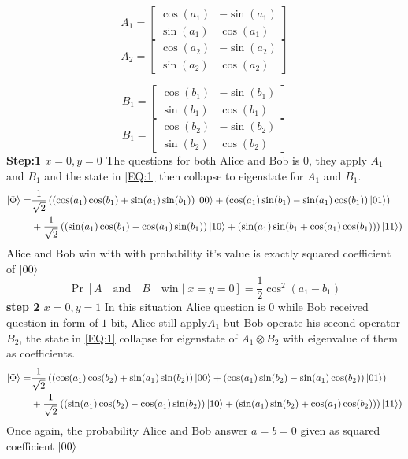 \[
A_1=
  \begin{bmatrix}
   \cos(a_1) & -\sin(a_1)\\
   \sin(a_1) & \cos(a_1)
  \end{bmatrix}
\]
\[
A_2=
  \begin{bmatrix}
   \cos(a_2) & -\sin(a_2)\\
   \sin(a_2) & \cos(a_2)
  \end{bmatrix}
\]

\[
B_1=
  \begin{bmatrix}
   \cos(b_1) & -\sin(b_1)\\
   \sin(b_1) & \cos(b_1)
  \end{bmatrix}
\]
\[
B_1=
  \begin{bmatrix}
   \cos(b_2) & -\sin(b_2)\\
   \sin(b_2) & \cos(b_2)
  \end{bmatrix}
\]
\textbf{Step:1 $x=0 ,y=0$}
The questions  for both Alice and Bob is  $0$, they apply $A_1$ and $B_1$ and the state in \ref{EQ:1} then collapse to eigenstate for $A_1$ and $B_1$.
\begin{align*}
\ket{\Phi}=&\frac{1}{\sqrt{2}}\left( \left(\cos(a_1) \cos(b_1) +\sin(a_1) \sin(b_1)\right)\ket{00}  +\left(\cos(a_1) \sin(b_1) -\sin(a_1) \cos(b_1)\right)\ket{01}\right)\\
&+\frac{1}{\sqrt{2}}\left(\left(\sin(a_1) \cos(b_1)-\cos(a_1) \sin(b_1)\right)\ket{10} +\left(\sin(a_1) \sin(b_1+\cos(a_1) \cos(b_1) )\right)\ket{11}\right)
\end{align*}
Alice and Bob win with with probability  it's value is exactly squared  coefficient of $\ket{00} $
$$\Pr[A\quad \text{and}\quad B \quad \text{win}\mid   x=y=0]=\frac{1}{2}\cos^2(a_1-b_1)$$
\textbf{step 2 $x=0 ,y=1$}
In this situation Alice question is $0$ while Bob received question in form of $1$ bit, Alice still apply$A_1$ but Bob operate his second operator $B_2$, the state in \ref{EQ:1} collapse for eigenstate of $A_1 \otimes B_2$ with eigenvalue of them as coefficients.
 \begin{align*}
\ket{\Phi}=&\frac{1}{\sqrt{2}}\left( \left(\cos(a_1) \cos(b_2) +\sin(a_1) \sin(b_2)\right)\ket{00}  +\left(\cos(a_1) \sin(b_2) -\sin(a_1) \cos(b_2)\right)\ket{01}\right)\\
&+\frac{1}{\sqrt{2}}\left(\left(\sin(a_1) \cos(b_2)-\cos(a_1) \sin(b_2)\right)\ket{10} +\left(\sin(a_1) \sin(b_2)+\cos(a_1) \cos(b_2) )\right)\ket{11}\right)
\end{align*}
Once again, the probability  Alice and Bob answer $a=b=0$  given as squared coefficient  $\ket{00}$
